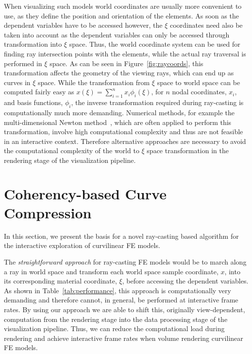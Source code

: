 \documentclass[journal]{vgtc}                %
\begin{document}
When visualizing such models world coordinates are usually more convenient to use, as they define the position and orientation of the elements. As soon as the dependent variables have to be accessed however, the $\xi$ coordinates need also be taken into account as the dependent variables can only be accessed through transformation into $\xi$ space. Thus, the world coordinate system can be used for finding ray intersection points with the elements, while the actual ray traversal is performed in $\xi$ space. As can be seen in Figure~\ref{fig:raycoords}, this transformation affects the geometry of the viewing rays, which can end up as curves in $\xi$ space. While the transformation from $\xi$ space to world space can be computed fairly easy as $x(\xi)=\sum_{i=1}^n x_i \phi_i(\xi)$, for $n$ nodal coordinates, $x_i$, and basis functions, $\phi_i$, the inverse transformation required during ray-casting is computationally much more demanding. Numerical methods, for example the multi-dimensional Newton method~\cite{Press92}, which are often applied to perform this transformation, involve high computational complexity and thus are not feasible in an interactive context. Therefore alternative approaches are necessary to avoid the computational complexity of the world to $\xi$ space transformation in the rendering stage of the visualization pipeline.
%
%
%
\section{Coherency-based Curve Compression}\label{sec:preprocessing}
In this section, we present the basis for a novel ray-casting based algorithm for the interactive exploration of curvilinear FE models.

The \emph{straightforward approach} for ray-casting FE models would be to march along a ray in world space and transform each world space sample coordinate, $x$, into its corresponding material coordinate, $\xi$, before accessing the dependent variables. As shown in Table~\ref{tab:performance}, this approach is computationally very demanding and therefore cannot, in general, be performed at interactive frame rates. By using our approach we are able to shift this, originally view-dependent, computation from the rendering stage into the data processing stage of the visualization pipeline. Thus, we can reduce the computational load during rendering and achieve interactive frame rates when volume rendering curvilinear FE models.
\end{document}
